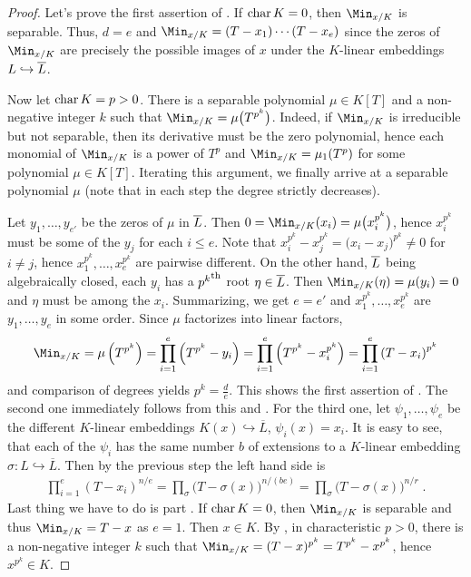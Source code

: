\documentclass[a4paper,parskip=half,numbers=enddot, DIV=12]{scrreprt}
\begin{document}
\begin{proof}
		Let's prove the first assertion of . If $\operatorname{char} K=0$, then $\Min_{x/K}$ is separable. Thus, $d=e$ and $\Min_{x/K}=(T-x_1)\cdots(T-x_e)$ since the zeros of $\Min_{x/K}$ are precisely the possible images of $x$ under the $K$-linear embeddings $L\hookrightarrow \overline L$.
		
		Now let $\operatorname{char} K=p>0$. There is a separable polynomial $\mu\in K[T]$ and a non-negative integer $k$ such that $\Min_{x/K}=\mu\big(T^{p^k}\big)$. Indeed, if $\Min_{x/K}$ is irreducible but not separable, then its derivative must be the zero polynomial, hence each monomial of $\Min_{x/K}$ is a power of $T^p$ and $\Min_{x/K}=\mu_1(T^p)$ for some polynomial $\mu\in K[T]$. Iterating this argument, we finally arrive at a separable polynomial $\mu$ (note that in each step the degree strictly decreases). 
		
		Let $y_1,\ldots,y_{e'}$ be the zeros of $\mu$ in $\overline L$.  Then $0=\Min_{x/K}(x_i)=\mu\big(x_i^{p^k}\big)$, hence $x_i^{p^k}$ must be some of the $y_j$ for each $i\leq e$. Note that $x_i^{p^k}-x_j^{p^k}=\big(x_i-x_j\big)^{p^k}\not=0$ for $i\not=j$, hence $x_1^{p^k},\ldots,x_e^{p^k}$ are pairwise different. On the other hand, $\overline L$ being algebraically closed, each $y_i$ has a ${p^k}^{\text{th}}$ root $\eta\in\overline L$. Then $\Min_{x/K}(\eta)=\mu(y_i)=0$ and $\eta$ must be among the $x_i$. Summarizing, we get $e=e'$ and $x_1^{p^k},\ldots,x_e^{p^k}$ are $y_1,\ldots,y_e$ in some order.  Since $\mu$ factorizes into linear factors,
		\begin{align*}
			\Min_{x/K}=\mu\left(T^{p^k}\right)=\prod_{i=1}^{e}\left(T^{p^k}-y_i\right)=\prod_{i=1}^{e}\left(T^{p^k}-x_i^{p^k}\right)=\prod_{i=1}^{e}\left(T-x_i\right)^{p^k}
		\end{align*}
		and comparison of degrees yields $p^k=\frac{d}{e}$. This shows the first assertion of . The second one immediately follows from this and . For the third one, let $\psi_1,\ldots,\psi_e$ be the different $K$-linear embeddings $K(x)\hookrightarrow\overline{L}$, $\psi_i(x)=x_i$. It is easy to see, that each of the $\psi_i$ has the same number $b$ of extensions to a $K$-linear embedding $\sigma\colon L\hookrightarrow \overline{L}$. Then by the previous step the left hand side is 
		\begin{align*}
			\prod_{i=1}^e(T-x_i)^{n/e} = \prod_\sigma \big(T-\sigma(x)\big)^{n/(be)} = \prod_\sigma \big(T-\sigma(x)\big)^{n/r}\;.
		\end{align*}
		Last thing we have to do is part . If $\operatorname{char} K=0$, then $\Min_{x/K}$ is separable and thus $\Min_{x/K}=T-x$ as $e=1$. Then $x\in K$.  By , in characteristic $p>0$, there is a non-negative integer $k$ such that $\Min_{x/K}=(T-x)^{p^k}=T^{p^k}-x^{p^k}$, hence $x^{p^k}\in K$.
\end{proof}
\end{document}
